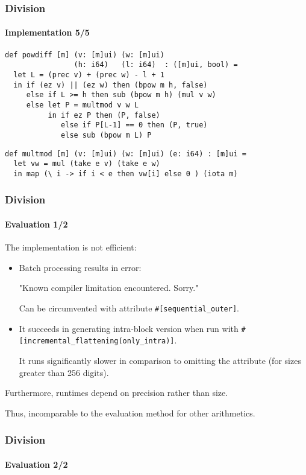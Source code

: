 \begin{frame}[fragile]
  \frametitle{Division}
  \framesubtitle{Implementation 5/5}
\begin{lstlisting}[language=futhark,basicstyle=\scriptsize,escapeinside=@@,firstnumber=49,frame=single]
def powdiff [m] (v: [m]ui) (w: [m]ui)
                (h: i64)   (l: i64)  : ([m]ui, bool) =
  let L = (prec v) + (prec w) - l + 1
  in if (ez v) || (ez w) then (bpow m h, false)
     else if L >= h then sub (bpow m h) (mul v w)
     else let P = multmod v w L
          in if ez P then (P, false)
             else if P[L-1] == 0 then (P, true)
             else sub (bpow m L) P
\end{lstlisting}\vspace*{0.5em}

\begin{lstlisting}[language=futhark,basicstyle=\scriptsize,escapeinside=@@,firstnumber=58,frame=single]
def multmod [m] (v: [m]ui) (w: [m]ui) (e: i64) : [m]ui =
  let vw = mul (take e v) (take e w)
  in map (\ i -> if i < e then vw[i] else 0 ) (iota m)
\end{lstlisting}
\end{frame}

\begin{frame}[fragile]
  \frametitle{Division}
  \framesubtitle{Evaluation 1/2}
  The implementation is not efficient:
  \begin{itemize}\footnotesize
  \item Batch processing results in error:

    "Known compiler limitation encountered. Sorry."

    Can be circumvented with attribute \texttt{\#[sequential\_outer]}.\pause

  \item It succeeds in generating intra-block version when run with
    \texttt{\#[incremental\_flattening(only\_intra)]}.

    It runs significantly slower in comparison to omitting the attribute (for
    sizes greater than 256 digits).
  \end{itemize}\vspace*{0.5em}\pause

  Furthermore, runtimes depend on precision rather than size.

  Thus, incomparable to the evaluation method for other arithmetics.
\end{frame}

\begin{frame}[fragile]
  \frametitle{Division}
  \framesubtitle{Evaluation 2/2}
\end{frame}

